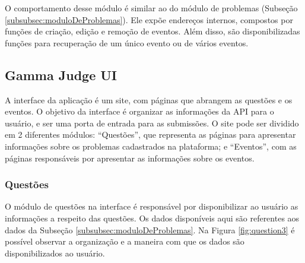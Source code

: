 O comportamento desse módulo é similar ao do módulo de problemas (Subseção \ref{subsubsec:moduloDeProblemas}). Ele expõe endereços internos, compostos por funções de criação, edição e remoção de eventos. Além disso, são disponibilizadas funções para recuperação de um único evento ou de vários eventos.

\subsection{Gamma Judge UI}
\label{sec:gamaJudgeUI}

A interface da aplicação é um site, com páginas que abrangem as questões e os eventos. O objetivo da interface é organizar as informações da API para o usuário, e ser uma porta de entrada para as submissões. O site pode ser dividido em 2 diferentes módulos: ``Questões'', que representa as páginas para apresentar informações sobre os problemas cadastrados na plataforma; e ``Eventos'', com as páginas responsáveis por apresentar as informações sobre os eventos. 




\subsubsection{Questões}

O módulo de questões na interface é responsável por disponibilizar ao usuário as informações a respeito das questões. Os dados disponíveis aqui são referentes aos dados da Subseção \ref{subsubsec:moduloDeProblemas}. Na Figura \ref{fig:question3} é possível observar a organização e a maneira com que os dados são disponibilizados ao usuário.

